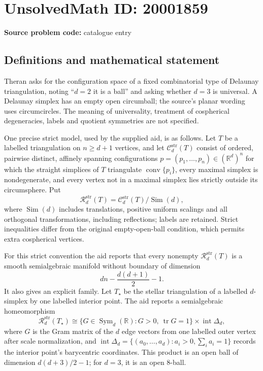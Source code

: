 \documentclass[11pt]{article}
\newcommand{\R}{\mathbb{R}}
\begin{document}
\section*{UnsolvedMath ID: 20001859}
\textbf{Source problem code:} catalogue entry
\subsection{Definitions and mathematical statement}
Theran asks for the configuration space of a fixed combinatorial type of Delaunay triangulation, noting ``\(d=2\) it is a ball'' and asking whether \(d=3\) is universal. A Delaunay simplex has an empty open circumball; the source's planar wording uses circumcircles. The meaning of universality, treatment of cospherical degeneracies, labels and quotient symmetries are not specified.

One precise strict model, used by the supplied aid, is as follows. Let \(T\) be a labelled triangulation on \(n\geq d+1\) vertices, and let \(\mathcal C_d^{\mathrm{str}}(T)\) consist of ordered, pairwise distinct, affinely spanning configurations \(p=(p_1,\ldots,p_n)\in(\R^d)^n\) for which the straight simplices of \(T\) triangulate \(\operatorname{conv}\{p_i\}\), every maximal simplex is nondegenerate, and every vertex not in a maximal simplex lies strictly outside its circumsphere. Put
\[
\mathcal R_d^{\mathrm{str}}(T)=\mathcal C_d^{\mathrm{str}}(T)/\operatorname{Sim}(d),
\]
where \(\operatorname{Sim}(d)\) includes translations, positive uniform scalings and all orthogonal transformations, including reflections; labels are retained. Strict inequalities differ from the original empty-open-ball condition, which permits extra cospherical vertices.

For this strict convention the aid reports that every nonempty \(\mathcal R_d^{\mathrm{str}}(T)\) is a smooth semialgebraic manifold without boundary of dimension
\[
dn-\frac{d(d+1)}2-1.
\]
It also gives an explicit family. Let \(T_\star\) be the stellar triangulation of a labelled \(d\)-simplex by one labelled interior point. The aid reports a semialgebraic homeomorphism
\[
\mathcal R_d^{\mathrm{str}}(T_\star)\cong
\{G\in\operatorname{Sym}_d(\R):G>0,\ \operatorname{tr}G=1\}
\times\operatorname{int}\Delta_d,
\]
where \(G\) is the Gram matrix of the \(d\) edge vectors from one labelled outer vertex after scale normalization, and \(\operatorname{int}\Delta_d=\{(a_0,\ldots,a_d):a_i>0,\sum_i a_i=1\}\) records the interior point's barycentric coordinates. This product is an open ball of dimension \(d(d+3)/2-1\); for \(d=3\), it is an open \(8\)-ball.
\end{document}
